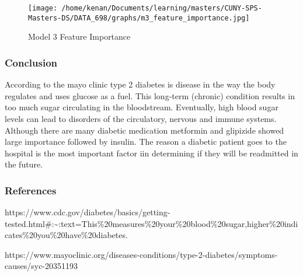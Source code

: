 \documentclass[5p]{elsarticle} %
\begin{document}
\begin{figure}
\hypertarget{id}{%
\centering
\texttt{[image: /home/kenan/Documents/learning/masters/CUNY-SPS-Masters-DS/DATA\_698/graphs/m3\_feature\_importance.jpg]}
\caption{Model 3 Feature Importance}\label{id}
}
\end{figure}

\clearpage
\twocolumn

\hypertarget{conclusion}{%
\subsubsection{Conclusion}\label{conclusion}}

According to the mayo clinic type 2 diabetes is disease in the way the
body regulates and uses glucose as a fuel. This long-term (chronic)
condition results in too much sugar circulating in the bloodstream.
Eventually, high blood sugar levels can lead to disorders of the
circulatory, nervous and immune systems. Although there are many
diabetic medication metformin and glipizide showed large importance
followed by insulin. The reason a diabetic patient goes to the hospital
is the most important factor iin determining if they will be readmitted
in the future.

\hypertarget{references}{%
\subsubsection{References}\label{references}}

https://www.cdc.gov/diabetes/basics/getting-tested.html\#:\textasciitilde:text=This\%20measures\%20your\%20blood\%20sugar,higher\%20indicates\%20you\%20have\%20diabetes.

https://www.mayoclinic.org/diseases-conditions/type-2-diabetes/symptoms-causes/syc-20351193
\end{document}
